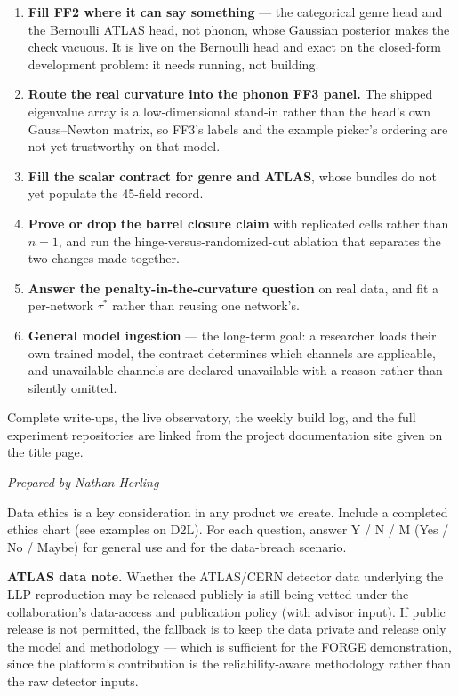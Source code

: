 \documentclass[11pt]{article}
\newcommand{\preparedby}{%
  \par\nobreak\vspace{-6pt}%
  {\footnotesize\itshape\color{forgemute}Prepared by Nathan Herling}%
  \par\vspace{4pt}}
\begin{document}
\begin{enumerate}[leftmargin=1.6em]\setlength{\itemsep}{2pt}
  \item \textbf{Fill FF2 where it can say something} --- the categorical genre
        head and the Bernoulli ATLAS head, not phonon, whose Gaussian posterior
        makes the check vacuous. It is live on the Bernoulli head and exact on
        the closed-form development problem: it needs running, not building.
  \item \textbf{Route the real curvature into the phonon FF3 panel.} The
        shipped eigenvalue array is a low-dimensional stand-in rather than the
        head's own Gauss--Newton matrix, so FF3's labels and the example
        picker's ordering are not yet trustworthy on that model.
  \item \textbf{Fill the scalar contract for genre and ATLAS}, whose bundles do
        not yet populate the 45-field record.
  \item \textbf{Prove or drop the barrel closure claim} with replicated cells
        rather than $n=1$, and run the hinge-versus-randomized-cut ablation
        that separates the two changes made together.
  \item \textbf{Answer the penalty-in-the-curvature question} on real data,
        and fit a per-network $\tau^*$ rather than reusing one network's.
  \item \textbf{General model ingestion} --- the long-term goal: a researcher
        loads their own trained model, the contract determines which channels
        are applicable, and unavailable channels are declared unavailable with
        a reason rather than silently omitted.
\end{enumerate}

Complete write-ups, the live observatory, the weekly build log, and the full
experiment repositories are linked from the project documentation site given
on the title page.

\preparedby
\begin{guidance}
Data ethics is a key consideration in any product we create. Include a completed ethics chart (see examples on D2L). For each question, answer Y / N / M (Yes / No / Maybe) for general use and for the data-breach scenario.
\end{guidance}

\noindent\textbf{ATLAS data note.} Whether the ATLAS/CERN detector data underlying the LLP reproduction may be released publicly is still being vetted under the collaboration's data-access and publication policy (with advisor input). If public release is not permitted, the fallback is to keep the data private and release only the model and methodology --- which is sufficient for the FORGE demonstration, since the platform's contribution is the reliability-aware methodology rather than the raw detector inputs.
\end{document}

